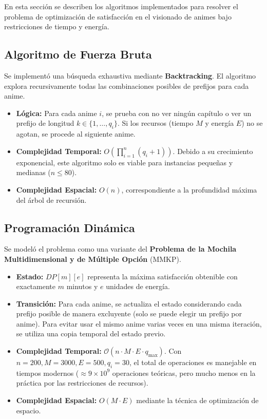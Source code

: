 
En esta sección se describen los algoritmos implementados para resolver el problema de optimización de satisfacción en el visionado de animes bajo restricciones de tiempo y energía.

\subsection{Algoritmo de Fuerza Bruta}
Se implementó una búsqueda exhaustiva mediante \textbf{Backtracking}. El algoritmo explora recursivamente todas las combinaciones posibles de prefijos para cada anime. 
\begin{itemize}
    \item \textbf{Lógica:} Para cada anime $i$, se prueba con no ver ningún capítulo o ver un prefijo de longitud $k \in \{1, \dots, q_i\}$. Si los recursos (tiempo $M$ y energía $E$) no se agotan, se procede al siguiente anime.
    \item \textbf{Complejidad Temporal:} $O(\prod_{i=1}^n (q_i + 1))$. Debido a su crecimiento exponencial, este algoritmo solo es viable para instancias pequeñas y medianas ($n \le 80$).
    \item \textbf{Complejidad Espacial:} $O(n)$, correspondiente a la profundidad máxima del árbol de recursión.
\end{itemize}

\subsection{Programación Dinámica}
Se modeló el problema como una variante del \textbf{Problema de la Mochila Multidimensional y de Múltiple Opción} (MMKP).
\begin{itemize}
    \item \textbf{Estado:} $DP[m][e]$ representa la máxima satisfacción obtenible con exactamente $m$ minutos y $e$ unidades de energía.
    \item \textbf{Transición:} Para cada anime, se actualiza el estado considerando cada prefijo posible de manera excluyente (solo se puede elegir un prefijo por anime). Para evitar usar el mismo anime varias veces en una misma iteración, se utiliza una copia temporal del estado previo.
    \item \textbf{Complejidad Temporal:} $\mathcal{O}(n \cdot M \cdot E \cdot q_{\max})$. Con $n=200, M=3000, E=500, q_i=30$, el total de operaciones es manejable en tiempos modernos ($\approx 9 \times 10^9$ operaciones teóricas, pero mucho menos en la práctica por las restricciones de recursos).
    \item \textbf{Complejidad Espacial:} $O(M \cdot E)$ mediante la técnica de optimización de espacio.
\end{itemize}

